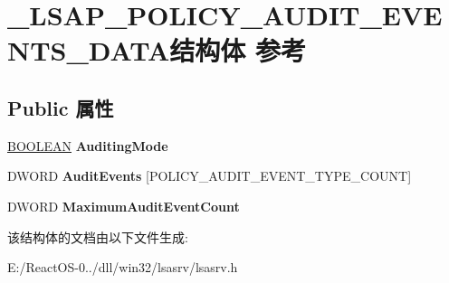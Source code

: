 \hypertarget{struct___l_s_a_p___p_o_l_i_c_y___a_u_d_i_t___e_v_e_n_t_s___d_a_t_a}{}\section{\+\_\+\+L\+S\+A\+P\+\_\+\+P\+O\+L\+I\+C\+Y\+\_\+\+A\+U\+D\+I\+T\+\_\+\+E\+V\+E\+N\+T\+S\+\_\+\+D\+A\+T\+A结构体 参考}
\label{struct___l_s_a_p___p_o_l_i_c_y___a_u_d_i_t___e_v_e_n_t_s___d_a_t_a}
\subsection*{Public 属性}
\begin{DoxyCompactItemize}
\item 
\mbox{\label{struct___l_s_a_p___p_o_l_i_c_y___a_u_d_i_t___e_v_e_n_t_s___d_a_t_a_a8b8f97606aba8766435fffb667a85667}} 
\hyperlink{_processor_bind_8h_a112e3146cb38b6ee95e64d85842e380a}{B\+O\+O\+L\+E\+AN} {\bfseries Auditing\+Mode}
\item 
\mbox{\label{struct___l_s_a_p___p_o_l_i_c_y___a_u_d_i_t___e_v_e_n_t_s___d_a_t_a_af051fd26a7d74e4f18bfc63a3fe327b7}} 
D\+W\+O\+RD {\bfseries Audit\+Events} \mbox{[}P\+O\+L\+I\+C\+Y\+\_\+\+A\+U\+D\+I\+T\+\_\+\+E\+V\+E\+N\+T\+\_\+\+T\+Y\+P\+E\+\_\+\+C\+O\+U\+NT\mbox{]}
\item 
\mbox{\label{struct___l_s_a_p___p_o_l_i_c_y___a_u_d_i_t___e_v_e_n_t_s___d_a_t_a_adc774685aa5815dccbb5c8a8d0ed54fc}} 
D\+W\+O\+RD {\bfseries Maximum\+Audit\+Event\+Count}
\end{DoxyCompactItemize}


该结构体的文档由以下文件生成\+:\begin{DoxyCompactItemize}
\item 
E\+:/\+React\+O\+S-\/0../dll/win32/lsasrv/lsasrv.\+h\end{DoxyCompactItemize}
